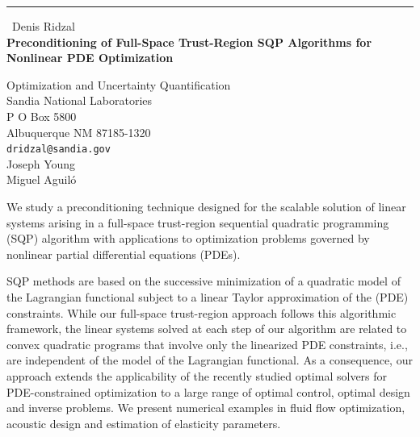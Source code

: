 \documentclass{report}
\begin{document}
\begin{center}
\rule{6in}{1pt} \
{\large Denis Ridzal \\
{\bf Preconditioning of Full-Space Trust-Region SQP Algorithms for Nonlinear PDE Optimization}}

Optimization and Uncertainty Quantification \\ Sandia National Laboratories \\ P O Box 5800 \\ Albuquerque NM 87185-1320
\\
{\tt dridzal@sandia.gov}\\
Joseph Young\\
Miguel Aguil\'o\end{center}

We study a preconditioning technique designed for the
scalable solution of linear systems arising in a full-space
trust-region sequential quadratic programming (SQP)
algorithm with applications to optimization problems
governed by nonlinear partial differential equations (PDEs).

SQP methods are based on the successive minimization of a
quadratic model of the Lagrangian functional subject to a
linear Taylor approximation of the (PDE) constraints.
While our full-space trust-region approach follows this
algorithmic framework, the linear systems solved at each
step of our algorithm are related to convex quadratic
programs that involve only the linearized PDE constraints,
i.e., are independent of the model of the Lagrangian
functional.
As a consequence, our approach extends the applicability
of the recently studied optimal solvers for PDE-constrained
optimization to a large range of optimal control, optimal
design and inverse problems.
We present numerical examples in fluid flow optimization,
acoustic design and estimation of elasticity parameters.
\end{document}
